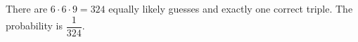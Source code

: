 There are $ 6\cdot6\cdot9=324 $ equally likely guesses and exactly one correct triple. The probability is $\boxed{\dfrac{1}{324}}$.
